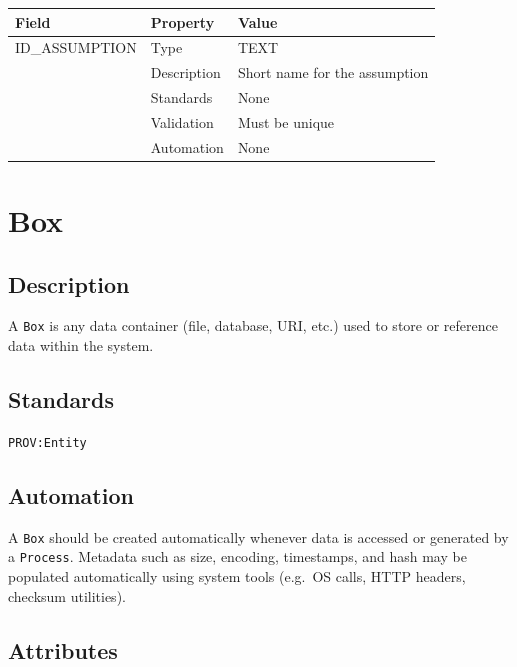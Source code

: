 \documentclass[
]{article}
\newcounter{none} %
\begin{document}
{\def\LTcaptype{none} %
\begin{longtable}[]{@{}lll@{}}
\toprule\noalign{}
Field & Property & Value \\
\midrule\noalign{}
\endhead
\bottomrule\noalign{}
\endlastfoot
ID\_ASSUMPTION & Type & TEXT \\
& Description & Short name for the assumption \\
& Standards & None \\
& Validation & Must be unique \\
& Automation & None \\
\end{longtable}
}

\section{Box}\label{box}

\subsection{Description}\label{description-4}

A \texttt{Box} is any data container (file, database, URI, etc.) used to
store or reference data within the system.

\subsection{Standards}\label{standards-6}

\texttt{PROV:Entity}

\subsection{Automation}\label{automation-6}

A \texttt{Box} should be created automatically whenever data is accessed
or generated by a \texttt{Process}. Metadata such as size, encoding,
timestamps, and hash may be populated automatically using system tools
(e.g.~OS calls, HTTP headers, checksum utilities).

\subsection{Attributes}\label{attributes-6}
\end{document}
